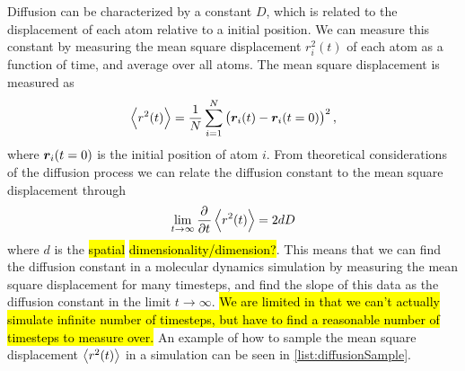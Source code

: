 Diffusion can be characterized by a constant $D$, which is related to the displacement of each atom relative to a initial position. We can measure this constant by measuring the mean square displacement $r_i^2(t)$ of each atom as a function of time, and average over all atoms. The mean square displacement is measured as
\begin{align*}
    \Braket{r^2(t)} = \frac{1}{N} \sum_{i=1}^N \left( \boldsymbol{r}_i(t) - \boldsymbol{r}_i(t=0) \right)^2,
\end{align*}
where $\boldsymbol{r}_i(t=0)$ is the initial position of atom $i$. From theoretical considerations of the diffusion process we can relate the diffusion constant to the mean square displacement through\cite[Section~4.4.1]{frenkel2001understanding}
\begin{align}
    \lim_{t\rightarrow \infty}\dpd{}{t}\Braket{r^2(t)} = 2dD\label{eq:diffusion_derivative}
\end{align}
where $d$ is the \hl{spatial} \hl{dimensionality/dimension?}. This means that we can find the diffusion constant in a molecular dynamics simulation by measuring the mean square displacement for many timesteps, and find the slope of this data as the diffusion constant in the limit $t\rightarrow \infty$. \hl{We are limited in that we can't actually simulate infinite number of timesteps, but have to find a reasonable number of timesteps to measure over.} An example of how to sample the mean square displacement $\Braket{r^2(t)}$ in a simulation can be seen in \cref{list:diffusionSample}.
%
%
% 
